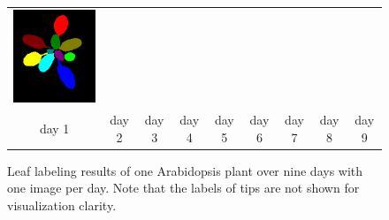 \begin{figure}
\begin{centering}
\begin{tabular}{@{}c@{} c@{} c@{} c@{} c@{} c@{} c@{} c@{} c@{}}
\includegraphics[width=.11\textwidth]{Figures/labelExample/plant_1_day_9_num_13.png}\\
  day 1 & day 2 & day 3 & day 4 & day 5 & day 6 & day 7 & day 8 & day 9 \\
\end{tabular}
\caption{Leaf labeling results of one Arabidopsis plant over nine days with one image per day. Note that the labels of tips are not shown for visualization clarity. }
\label{fig:LabelExample}
\end{centering}
\end{figure}



